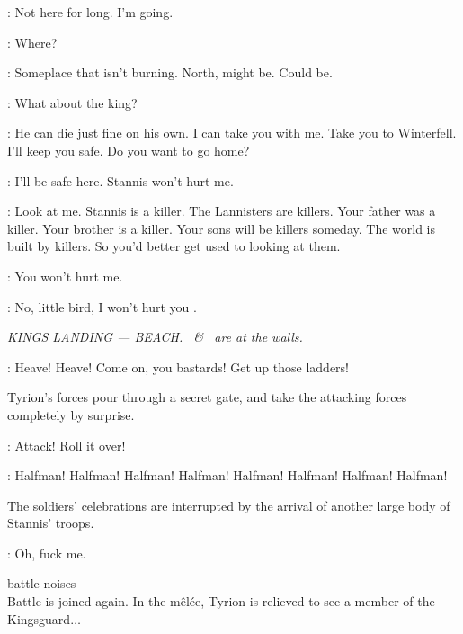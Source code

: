 \HOUND: Not here for long. 
I'm going. 

\SANSA: Where? 

\HOUND: Someplace that isn't burning. 
North, might be. 
Could be. 

\SANSA: What about the king? 

\HOUND: He can die just fine on his own. 
I can take you with me. 
Take you to Winterfell. 
I'll keep you safe. 
Do you want to go home? 

\SANSA: I'll be safe here. 
Stannis won't hurt me. 

\HOUND: Look at me. 
Stannis is a killer. 
The Lannisters are killers. 
Your father was a killer. 
Your brother is a killer. 
Your sons will be killers someday. 
The world is built by killers. 
So you'd better get used to looking at them. 

\SANSA: You won't hurt me. 

\HOUND: No, little bird, I won't hurt you .

\scene

\textit{KINGS LANDING --- BEACH. \CAPTAIN ~\& \STANNIS ~are at the walls.} 

\CAPTAIN: Heave! Heave! 
Come on, you bastards! Get up those ladders! 


\n Tyrion's forces pour through a secret gate, and take the attacking
forces completely by surprise.\\

\TYRION: Attack! 
Roll it over! 

\CROWD: Halfman! Halfman! Halfman! Halfman! 
Halfman! Halfman! Halfman! Halfman! 

\n The soldiers' celebrations are interrupted by the arrival of
another large body of Stannis' troops.\\

\TYRION:  Oh, fuck me. 

\sfx battle noises\\
\n Battle is joined again. In the m\^el\'ee, Tyrion is relieved to see
a member of the Kingsguard$\ldots$

\\ 
\\

